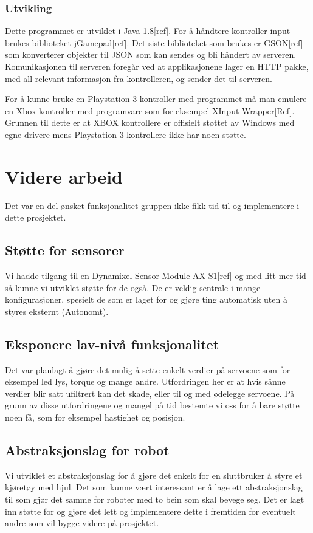 \documentclass[12pt]{report}
\begin{document}
\subsection{Utvikling}
Dette programmet er utviklet i Java 1.8[ref]. For å håndtere kontroller input brukes biblioteket jGamepad[ref]. Det siste biblioteket som brukes er GSON[ref] som konverterer objekter til JSON som kan sendes og bli håndert av serveren. Komunikasjonen til serveren foregår ved at applikasjonene lager en HTTP pakke, med all relevant informasjon fra kontrolleren, og sender det til serveren.

For å kunne bruke en Playstation 3 kontroller med programmet må man emulere en Xbox kontroller med programvare som for eksempel XInput Wrapper[Ref]. Grunnen til dette er at XBOX kontrollere er offisielt støttet av Windows med egne drivere mens Playstation 3 kontrollere ikke har noen støtte.

\clearpage

\chapter{Videre arbeid}
Det var en del ønsket funksjonalitet gruppen ikke fikk tid til og implementere i dette prosjektet.

\section{Støtte for sensorer}
Vi hadde tilgang til en Dynamixel Sensor Module AX-S1[ref] og med litt mer tid så kunne vi utviklet støtte for de også. De er veldig sentrale i mange konfigurasjoner, spesielt de som er laget for og gjøre ting automatisk uten å styres eksternt (Autonomt).

\section{Eksponere lav-nivå funksjonalitet}
Det var planlagt å gjøre det mulig å sette enkelt verdier på servoene som for eksempel led lys, torque og mange andre. Utfordringen her er at hvis sånne verdier blir satt ufiltrert kan det skade, eller til og med ødelegge servoene. På grunn av disse utfordringene og mangel på tid bestemte vi oss for å bare støtte noen få, som for eksempel hastighet og posisjon.

\section{Abstraksjonslag for robot}
Vi utviklet et abstraksjonslag for å gjøre det enkelt for en sluttbruker å styre et kjøretøy med hjul. Det som kunne vært interessant er å lage ett abstraksjonslag til som gjør det samme for roboter med to bein som skal bevege seg. Det er lagt inn støtte for og gjøre det lett og implementere dette i fremtiden for eventuelt andre som vil bygge videre på prosjektet.
\end{document}
